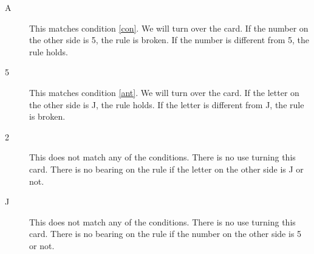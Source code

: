 \documentclass[a4paper]{exam}
\begin{document}
\begin{questions}
\begin{solution}
    \begin{description}
    \item[A] This matches condition \ref{con}. We will turn over the card. If the number on the other side is 5, the rule is broken. If the number is different from 5, the rule holds.
    \item[5] This matches condition \ref{ant}. We will turn over the card. If the letter on the other side is J, the rule holds. If the letter is different from J, the rule is broken. 
    \item[2] This does not match any of the conditions. There is no use turning this card. There is no bearing on the rule if the letter on the other side is J or not.
    \item[J] This does not match any of the conditions. There is no use turning this card. There is no bearing on the rule if the number on the other side is 5 or not.
    \end{description}
    \end{solution}

  
\end{questions}
\end{document}
